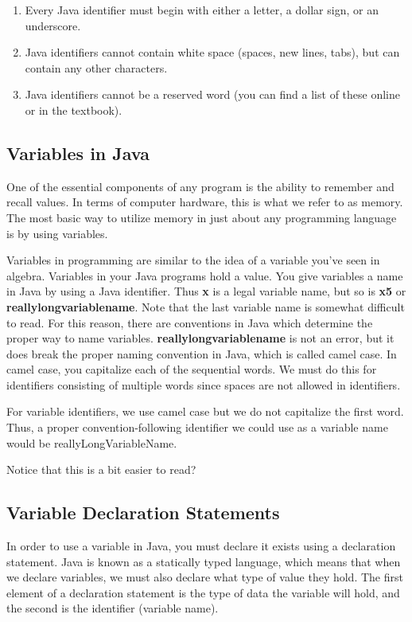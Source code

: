 \begin{enumerate}
\item Every Java identifier must begin with either a letter, a dollar sign, or an underscore.
\item Java identifiers cannot contain white space (spaces, new lines, tabs), but can contain any other characters. 
\item Java identifiers cannot be a reserved word (you can find a list of these online or in the textbook).
\end{enumerate}

\subsection{Variables in Java}

One of the essential components of any program is the ability to remember and recall values. In terms of computer hardware, this is what we refer to as memory. The most basic way to utilize memory in just about any programming language is by using variables.

Variables in programming are similar to the idea of a variable you've seen in algebra. Variables in your Java programs hold a value. You give variables a name in Java by using a Java identifier. Thus \textbf{x} is a legal 
variable name, but so is \textbf{x5} or \textbf{reallylongvariablename}. Note that the last variable name
is somewhat difficult to read. For this reason, there are conventions in Java which 
determine the proper way to name variables. \textbf{reallylongvariablename} is not an error, but it does break the proper naming convention in Java, which is called camel case. In camel case, you capitalize each of the sequential words. We must do this for identifiers consisting of multiple words since spaces are not allowed in identifiers. 

For variable identifiers, we use camel case but we do not capitalize the first word. Thus, a proper convention-following identifier we could use as a variable name would be reallyLongVariableName. 

Notice that this is a bit easier to read? 

\subsection{Variable Declaration Statements}

In order to use a variable in Java, you must declare it exists using a declaration statement. Java is known as a statically typed language, which means that when we declare variables, we must also declare what type of value they hold. The first element of a declaration statement is the type of data the variable will hold, and the second is the identifier (variable name). 

